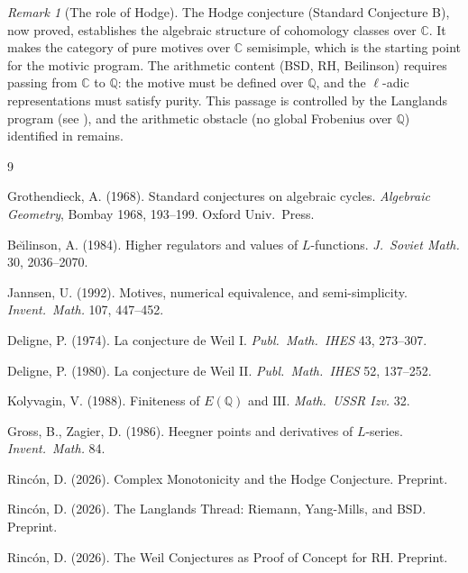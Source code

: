 \documentclass[12pt]{article}
\theoremstyle{definition}
\theoremstyle{remark}
\newtheorem{remark}[theorem]{Remark}
\begin{document}
\begin{remark}[The role of Hodge]
The Hodge conjecture (Standard Conjecture B), now proved, establishes the
algebraic structure of cohomology classes over $\mathbb{C}$. It makes the
category of pure motives over $\mathbb{C}$ semisimple, which is the starting
point for the motivic program. The arithmetic content (BSD, RH, Beilinson)
requires passing from $\mathbb{C}$ to $\mathbb{Q}$: the motive must be
defined over $\mathbb{Q}$, and the $\ell$-adic representations must satisfy
purity. This passage is controlled by the Langlands program (see \cite{langlands}),
and the arithmetic obstacle (no global Frobenius over $\mathbb{Q}$) identified
in \cite{weil} remains.
\end{remark}

\begin{thebibliography}{9}

Grothendieck, A. (1968).
Standard conjectures on algebraic cycles.
\textit{Algebraic Geometry}, Bombay 1968, 193--199. Oxford Univ.\ Press.

Be\u{\i}linson, A. (1984).
Higher regulators and values of $L$-functions.
\textit{J.\ Soviet Math.} 30, 2036--2070.

Jannsen, U. (1992).
Motives, numerical equivalence, and semi-simplicity.
\textit{Invent.\ Math.} 107, 447--452.

Deligne, P. (1974).
La conjecture de Weil I.
\textit{Publ.\ Math.\ IHES} 43, 273--307.

Deligne, P. (1980).
La conjecture de Weil II.
\textit{Publ.\ Math.\ IHES} 52, 137--252.

Kolyvagin, V. (1988).
Finiteness of $E(\mathbb{Q})$ and $\mathrm{III}$.
\textit{Math.\ USSR Izv.} 32.

Gross, B., Zagier, D. (1986).
Heegner points and derivatives of $L$-series.
\textit{Invent.\ Math.} 84.

Rinc\'on, D. (2026).
Complex Monotonicity and the Hodge Conjecture. Preprint.

Rinc\'on, D. (2026).
The Langlands Thread: Riemann, Yang-Mills, and BSD. Preprint.

Rinc\'on, D. (2026).
The Weil Conjectures as Proof of Concept for RH. Preprint.

\end{thebibliography}
\end{document}
